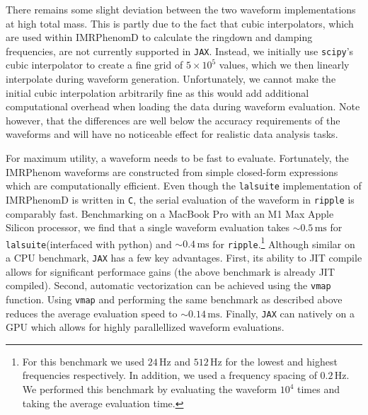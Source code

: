 \documentclass[twocolumn]{aastex631}
\newcommand{\jax}{\texttt{JAX}\xspace}
\newcommand{\ripple}{\texttt{ripple}\xspace}
\newcommand{\lalsuite}{\texttt{lalsuite}\xspace}
\newcommand{\te}[1]{\textbf{\color{pyGreen}(TE: #1)}}
\newcommand{\dfm}[1]{{\color{dfm}[DFM: #1]}}
\begin{document}
There remains some slight deviation between the two waveform implementations at high total mass. 
This is partly due to the fact that cubic interpolators, which are used within IMRPhenomD to calculate the ringdown and damping frequencies, are not currently supported in \jax. 
Instead, we initially use \texttt{scipy}'s cubic interpolator to create a fine grid of $5\times10^5$ values, which we then linearly interpolate during waveform generation.
Unfortunately, we cannot make the initial cubic interpolation arbitrarily fine as this would add additional computational overhead when loading the data during waveform evaluation.
Note however, that the differences are well below the accuracy requirements of the waveforms and will have no noticeable effect for realistic data analysis tasks.

For maximum utility, a waveform needs to be fast to evaluate.
Fortunately, the IMRPhenom waveforms are constructed from simple closed-form expressions which are computationally efficient.
Even though the \lalsuite implementation of IMRPhenomD is written in \texttt{C}, the serial evaluation of the waveform in \ripple is comparably fast. 
Benchmarking on a MacBook Pro with an M1 Max Apple Silicon processor, we find that a single waveform evaluation takes $\sim 0.5\,\mathrm{ms}$ for \lalsuite (interfaced with python) and $\sim 0.4\,\mathrm{ms}$ for \ripple.\footnote{
    For this benchmark we used $24\,\mathrm{Hz}$ and $512\,\mathrm{Hz}$ for the lowest and highest frequencies respectively. 
    In addition, we used a frequency spacing of $0.2\,\mathrm{Hz}$. 
    We performed this benchmark by evaluating the waveform $10^{4}$ times and taking the average evaluation time.
}
Although similar on a CPU benchmark, \jax has a few key advantages. 
First, its ability to JIT compile allows for significant performace gains (the above benchmark is already JIT compiled).
Second, automatic vectorization can be achieved using the \texttt{vmap} function.
Using \texttt{vmap} and performing the same benchmark as described above reduces the average evaluation speed to $\sim 0.14\,\mathrm{ms}$.
Finally, \jax can natively on a GPU which allows for highly parallellized waveform evaluations.
\end{document}
